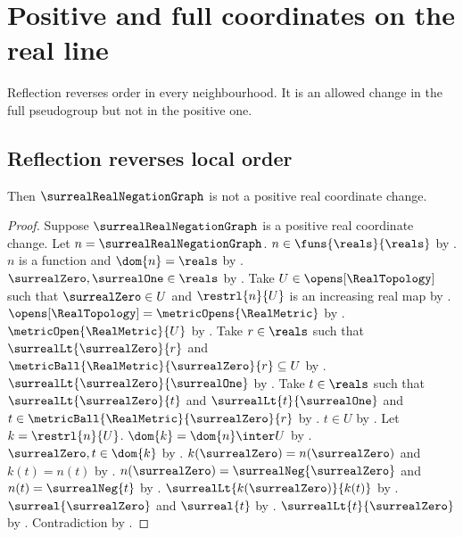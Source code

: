 \section{Positive and full coordinates on the real line}







Reflection reverses order in every neighbourhood. It is an allowed change in
the full pseudogroup but not in the positive one.

\subsection{Reflection reverses local order}

\begin{theorem}\label{real_reflection_not_positive}
    Then $\surrealRealNegationGraph$ is not a positive real coordinate change.
\end{theorem}
\begin{proof}
    Suppose $\surrealRealNegationGraph$ is a positive real coordinate change.
    Let $n=\surrealRealNegationGraph$.
    $n\in\funs{\reals}{\reals}$ by .
    $n$ is a function and $\dom{n}=\reals$ by .
    $\surrealZero,\surrealOne\in\reals$ by
        .
    Take $U\in\opens[\RealTopology]$ such that $\surrealZero\in U$ and
        $\restrl{n}{U}$ is an increasing real map by .
    $\opens[\RealTopology]=\metricOpens{\RealMetric}$ by
        .
    $\metricOpen{\RealMetric}{U}$ by .
    Take $r\in\reals$ such that $\surrealLt{\surrealZero}{r}$ and
        $\metricBall{\RealMetric}{\surrealZero}{r}\subseteq U$ by .
    $\surrealLt{\surrealZero}{\surrealOne}$ by .
    Take $t\in\reals$ such that $\surrealLt{\surrealZero}{t}$ and
        $\surrealLt{t}{\surrealOne}$ and
        $t\in\metricBall{\RealMetric}{\surrealZero}{r}$ by
        .
    $t\in U$ by .
    Let $k=\restrl{n}{U}$.
    $\dom{k}=\dom{n}\inter U$ by .
    $\surrealZero,t\in\dom{k}$ by .
    $k(\surrealZero)=n(\surrealZero)$ and $k(t)=n(t)$ by
        .
    $n(\surrealZero)=\surrealNeg{\surrealZero}$ and $n(t)=\surrealNeg{t}$ by
        .
    $\surrealLt{k(\surrealZero)}{k(t)}$ by .
    $\surreal{\surrealZero}$ and $\surreal{t}$ by .
    $\surrealLt{t}{\surrealZero}$ by .
    Contradiction by .
\end{proof}

